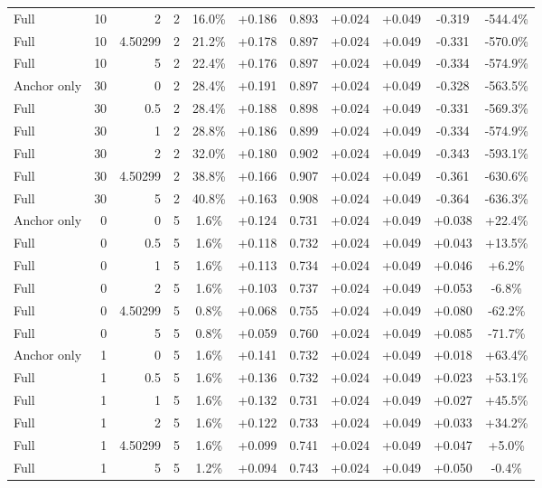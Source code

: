\begin{table}[htbp]
\begin{tabular}{lrrrccccccc}
Full & 10 & 2 & 2 & 16.0\% & +0.186 & 0.893 & +0.024 & +0.049 & -0.319 & -544.4\% \\
Full & 10 & 4.50299 & 2 & 21.2\% & +0.178 & 0.897 & +0.024 & +0.049 & -0.331 & -570.0\% \\
Full & 10 & 5 & 2 & 22.4\% & +0.176 & 0.897 & +0.024 & +0.049 & -0.334 & -574.9\% \\
Anchor only & 30 & 0 & 2 & 28.4\% & +0.191 & 0.897 & +0.024 & +0.049 & -0.328 & -563.5\% \\
Full & 30 & 0.5 & 2 & 28.4\% & +0.188 & 0.898 & +0.024 & +0.049 & -0.331 & -569.3\% \\
Full & 30 & 1 & 2 & 28.8\% & +0.186 & 0.899 & +0.024 & +0.049 & -0.334 & -574.9\% \\
Full & 30 & 2 & 2 & 32.0\% & +0.180 & 0.902 & +0.024 & +0.049 & -0.343 & -593.1\% \\
Full & 30 & 4.50299 & 2 & 38.8\% & +0.166 & 0.907 & +0.024 & +0.049 & -0.361 & -630.6\% \\
Full & 30 & 5 & 2 & 40.8\% & +0.163 & 0.908 & +0.024 & +0.049 & -0.364 & -636.3\% \\
Anchor only & 0 & 0 & 5 & 1.6\% & +0.124 & 0.731 & +0.024 & +0.049 & +0.038 & +22.4\% \\
Full & 0 & 0.5 & 5 & 1.6\% & +0.118 & 0.732 & +0.024 & +0.049 & +0.043 & +13.5\% \\
Full & 0 & 1 & 5 & 1.6\% & +0.113 & 0.734 & +0.024 & +0.049 & +0.046 & +6.2\% \\
Full & 0 & 2 & 5 & 1.6\% & +0.103 & 0.737 & +0.024 & +0.049 & +0.053 & -6.8\% \\
Full & 0 & 4.50299 & 5 & 0.8\% & +0.068 & 0.755 & +0.024 & +0.049 & +0.080 & -62.2\% \\
Full & 0 & 5 & 5 & 0.8\% & +0.059 & 0.760 & +0.024 & +0.049 & +0.085 & -71.7\% \\
Anchor only & 1 & 0 & 5 & 1.6\% & +0.141 & 0.732 & +0.024 & +0.049 & +0.018 & +63.4\% \\
Full & 1 & 0.5 & 5 & 1.6\% & +0.136 & 0.732 & +0.024 & +0.049 & +0.023 & +53.1\% \\
Full & 1 & 1 & 5 & 1.6\% & +0.132 & 0.731 & +0.024 & +0.049 & +0.027 & +45.5\% \\
Full & 1 & 2 & 5 & 1.6\% & +0.122 & 0.733 & +0.024 & +0.049 & +0.033 & +34.2\% \\
Full & 1 & 4.50299 & 5 & 1.6\% & +0.099 & 0.741 & +0.024 & +0.049 & +0.047 & +5.0\% \\
Full & 1 & 5 & 5 & 1.2\% & +0.094 & 0.743 & +0.024 & +0.049 & +0.050 & -0.4\% \\

\end{tabular}
\end{table}
